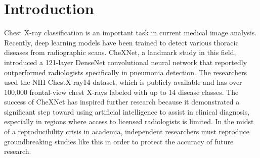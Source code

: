 \begin{abstract}
Deep learning for radiologic image analysis is a rapidly growing field in
biomedical research and is likely to become a standard practice in modern
medicine. We used the publicly available NIH ChestX-ray14 dataset, containing
112,120 frontal-view chest X-rays labeled for 14 thoracic pathologies in order to
reproduce the 14-pathology extension of CheXNet and built a modified model,
DACNet. The reproduced CheXNet model achieved a mean test AUROC of 0.8125,
compared with 0.8414 calculated from the 14 per-pathology AUROCs reported in the
original article. The modified model, DACNet achieved a mean test AUROC of 0.8474. As a secondary
analysis, per-pathology decision thresholds selected only on the validation set
produced test macro F1 scores of 0.2813 for the CheXNet reproduction and 0.3414
for DACNet. The original pneumonia-versus-radiologist F1 experiment could not
be reproduced because its expert annotations for the 420-image test set are not
publicly available.
\end{abstract}

\section{Introduction}

Chest X-ray classification is an important task in current medical image analysis. Recently, 
deep learning models have been trained to detect various thoracic diseases from
radiographic scans. CheXNet, a landmark study in this field,
introduced a 121-layer DenseNet convolutional neural network that reportedly
outperformed radiologists specifically in pneumonia detection\cite{rajpurkar2017}.
The researchers used the NIH ChestX-ray14 dataset, which is publicly available and has over
100,000 frontal-view chest X-rays labeled with up to 14 disease
classes\cite{nihxray2017}. The success of CheXNet has inspired further
research because it demonstrated a significant step toward using artificial
intelligence to assist in clinical diagnosis, especially in regions where
access to licensed radiologists is limited\cite{hwang2023}. In the midst of a
reproducibility crisis in academia, independent researchers must reproduce
groundbreaking studies like this in order to protect the accuracy of future
research\cite{noorden2015}.

